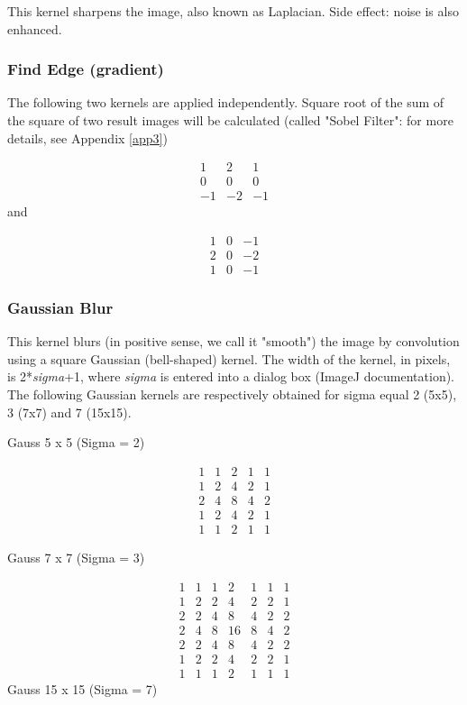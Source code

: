 This kernel sharpens the image, also known as Laplacian. Side effect:
noise is also enhanced. 


\subsubsection{Find Edge (gradient)}
\label{subsub:findedgekernel}
The following two kernels are applied independently. Square root of the sum
of the square of two result images will be calculated (called
"Sobel Filter": for more details,
see Appendix \ref{app3}) \ 

\[
 \begin{matrix}
  1 & 2 & 1 \\
  0 & 0 & 0 \\
  -1 & -2 & -1
 \end{matrix}
\]
and

\[
 \begin{matrix}
  1 & 0 & -1 \\
  2 & 0 & -2 \\
  1 & 0 & -1
 \end{matrix}
\]


\subsubsection{Gaussian Blur}

This kernel blurs (in positive sense, we call it
"smooth") the image by convolution
using a square Gaussian (bell-shaped) kernel. The width of the kernel,
in pixels, is 2*\textit{sigma}+1, where \textit{sigma} is entered into
a dialog box (ImageJ documentation). The following Gaussian kernels are respectively obtained for sigma equal 2 (5x5), 3 (7x7) and 7 (15x15). 

Gauss 5 x 5 (Sigma = 2)
 
\[
 \begin{matrix}
  1 & 1 & 2 & 1 & 1\\
  1 & 2 & 4 & 2 & 1\\
  2 & 4 & 8 & 4 & 2\\
  1 & 2 & 4 & 2 & 1\\
  1 & 1 & 2 & 1 & 1
 \end{matrix}
\]

Gauss 7 x 7 (Sigma = 3)

\[
 \begin{matrix}
  1 & 1 & 1 & 2 & 1 & 1 & 1\\
  1 & 2 & 2 & 4 & 2 & 2 & 1\\
  2 & 2 & 4 & 8 & 4 & 2 & 2\\
  2 & 4 & 8 & 16 & 8 & 4 & 2\\
  2 & 2 & 4 & 8 & 4 & 2 & 2\\
  1 & 2 & 2 & 4 & 2 & 2 & 1\\
  1 & 1 & 1 & 2 & 1 & 1 & 1
 \end{matrix}
\]
Gauss 15 x 15 (Sigma = 7)

